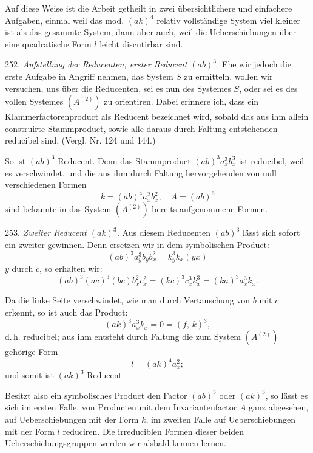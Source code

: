 \documentclass[11pt]{article}
\providecommand{\weberpage}[1]{}
\providecommand{\weq}[2]{\begin{equation}\tag{#1}#2\end{equation}}
\begin{document}
Auf diese Weise ist die Arbeit getheilt in zwei übersichtlichere und
einfachere Aufgaben, einmal weil das mod. $(ak)^4$ relativ vollständige
System viel kleiner ist als das gesammte System, dann aber auch, weil
die Ueberschiebungen über eine quadratische Form $l$ leicht discutirbar
sind.

252. \textit{Aufstellung der Reducenten; erster Reducent $(ab)^3$.} Ehe
wir jedoch die erste Aufgabe in Angriff nehmen, das System $S$ zu
ermitteln, wollen wir versuchen, uns über die Reducenten, sei es nun des
Systemes $S$, oder sei es des vollen Systemes $(A^{(2)})$ zu orientiren.
Dabei erinnere ich, dass ein Klammerfactorenproduct als Reducent
bezeichnet wird, sobald das aus ihm allein construirte Stammproduct,
sowie alle daraus durch Faltung entstehenden reducibel sind. (Vergl.
Nr. 124 und 144.)

So ist $(ab)^3$ Reducent. Denn das Stammproduct $(ab)^3 a_x^3 b_x^3$ ist
reducibel, weil es verschwindet, und die aus ihm durch Faltung
hervorgehenden von null verschiedenen Formen
\[
k = (ab)^4 a_x^2 b_x^2,\quad A = (ab)^6
\]
sind bekannte in das System $(A^{(2)})$ bereits aufgenommene Formen.

253. \textit{Zweiter Reducent $(ak)^3$.} Aus diesem Reducenten $(ab)^3$
lässt sich sofort ein zweiter gewinnen. Denn ersetzen wir in dem
symbolischen Product:
\[
(ab)^3 a_y^3 b_y b_x^2 = k_y^3 k_x (yx)
\]
$y$ durch $c$, so erhalten wir:
\[
(ab)^3(ac)^3(bc) b_x^2 c_x^2 = (kc)^3 c_x^3 k_x^3 = (ka)^3 a_x^3 k_x .
\]


\weberpage{277}

Da die linke Seite verschwindet, wie man durch Vertauschung von $b$ mit $c$
erkennt, so ist auch das Product:
\weq{1}{(ak)^3 a_x^3 k_x = 0 = (f,\,k)^3,}
d.\,h. reducibel; aus ihm entsteht durch Faltung die zum System $(A^{(2)})$
gehörige Form
\[
l = (ak)^4 a_x^2 ;
\]
und somit ist $(ak)^3$ Reducent.

Besitzt also ein symbolisches Product den Factor $(ab)^3$ oder $(ak)^3$,
so lässt es sich im ersten Falle, von Producten mit dem Invariantenfactor
$A$ ganz abgesehen, auf Ueberschiebungen mit der Form $k$, im zweiten
Falle auf Ueberschiebungen mit der Form $l$ reduciren. Die irreduciblen
Formen dieser beiden Ueberschiebungsgruppen werden wir alsbald kennen
lernen.
\end{document}
